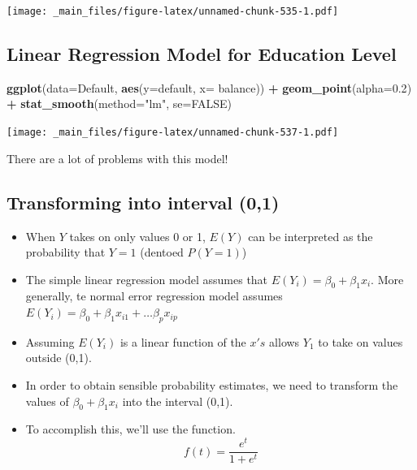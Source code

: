 \documentclass[]{book}
\newenvironment{Shaded}{\begin{snugshade}}{\end{snugshade}}
\newcommand{\KeywordTok}[1]{\textcolor[rgb]{0.13,0.29,0.53}{\textbf{#1}}}
\newcommand{\DataTypeTok}[1]{\textcolor[rgb]{0.13,0.29,0.53}{#1}}
\newcommand{\FloatTok}[1]{\textcolor[rgb]{0.00,0.00,0.81}{#1}}
\newcommand{\StringTok}[1]{\textcolor[rgb]{0.31,0.60,0.02}{#1}}
\newcommand{\CommentTok}[1]{\textcolor[rgb]{0.56,0.35,0.01}{\textit{#1}}}
\newcommand{\OtherTok}[1]{\textcolor[rgb]{0.56,0.35,0.01}{#1}}
\newcommand{\OperatorTok}[1]{\textcolor[rgb]{0.81,0.36,0.00}{\textbf{#1}}}
\newcommand{\NormalTok}[1]{#1}
\begin{document}
\texttt{[image: \_main\_files/figure-latex/unnamed-chunk-535-1.pdf]}

\subsection{Linear Regression Model for Education
Level}\label{linear-regression-model-for-education-level}

\begin{Shaded}
\end{Shaded}

\begin{Shaded}
\begin{Highlighting}[]
\KeywordTok{ggplot}\NormalTok{(}\DataTypeTok{data=}\NormalTok{Default, }\KeywordTok{aes}\NormalTok{(}\DataTypeTok{y=}\NormalTok{default, }\DataTypeTok{x=}\NormalTok{ balance)) }\OperatorTok{+}\StringTok{ }\KeywordTok{geom_point}\NormalTok{(}\DataTypeTok{alpha=}\FloatTok{0.2}\NormalTok{)  }\OperatorTok{+}\StringTok{ }\KeywordTok{stat_smooth}\NormalTok{(}\DataTypeTok{method=}\StringTok{"lm"}\NormalTok{, }\DataTypeTok{se=}\OtherTok{FALSE}\NormalTok{)}
\end{Highlighting}
\end{Shaded}

\texttt{[image: \_main\_files/figure-latex/unnamed-chunk-537-1.pdf]}

There are a lot of problems with this model!

\subsection{Transforming into interval
(0,1)}\label{transforming-into-interval-01}

\begin{itemize}
\item
  When \(Y\) takes on only values 0 or 1, \(E(Y)\) can be interpreted as
  the probability that \(Y=1\) (dentoed \(P(Y=1)\))
\item
  The simple linear regression model assumes that
  \(E(Y_i) = \beta_0+\beta_1x_i\). More generally, te normal error
  regression model assumes
  \(E(Y_i) = \beta_0+\beta_1x_{i1} + \ldots \beta_px_{ip}\)
\item
  Assuming \(E(Y_i)\) is a linear function of the \(x's\) allows \(Y_1\)
  to take on values outside (0,1).
\item
  In order to obtain sensible probability estimates, we need to
  transform the values of \(\beta_0+\beta_1x_i\) into the interval
  (0,1).
\item
  To accomplish this, we'll use the function. \[
  f(t)=\frac{e^t}{1+e^{t}}
  \]
\end{itemize}
\end{document}
